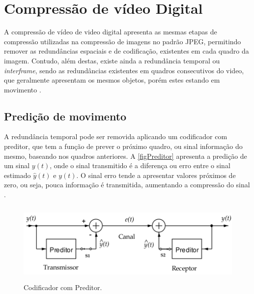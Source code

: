 \chapter{Compressão de vídeo Digital}
A compressão de vídeo de video digital apresenta as mesmas etapas de compressão utilizadas na compressão de imagens no padrão JPEG, permitindo remover as redundâncias espaciais e de codificação, existentes em cada quadro da imagem. Contudo, além destas, existe ainda a redundância temporal ou \textit{interframe}, sendo as redundâncias existentes em quadros consecutivos do video, que geralmente apresentam os mesmos objetos, porém estes estando em movimento \cite{oge}\cite{ogeMatlab}. 





\section{Predição de movimento}
A redundância temporal pode ser removida aplicando um codificador com preditor, que tem a função de prever o próximo quadro, ou sinal informação do mesmo,  baseando nos quadros anteriores. A \autoref{figPreditor} apresenta a predição de um sinal $y(t)$, onde o sinal transmitido é a diferença ou erro entre o sinal estimado $\hat{y}(t)$ e $y(t)$. O sinal erro tende a apresentar valores próximos de zero, ou seja, pouca informação é transmitida, aumentando a compressão do sinal \cite{tvDigitalUSP}.

\begin{figure}[htb]
	\caption{\label{figPreditor}Codificador com Preditor.}
	\begin{center}
		\includegraphics[height=4cm]{figPreditor.png}
	\end{center}
\end{figure}

